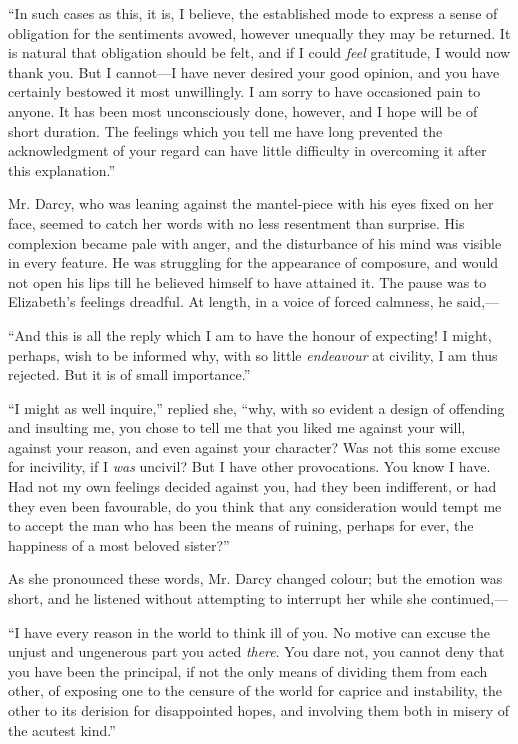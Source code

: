 \documentclass[12pt,openright]{book}
\begin{document}
“In such cases as this, it is, I believe, the established mode to express a sense of obligation for the sentiments avowed, however unequally they may be returned. It is natural that obligation should be felt, and if I could \textit{feel} gratitude, I would now thank you. But I cannot—I have never desired your good opinion, and you have certainly bestowed it most unwillingly. I am sorry to have occasioned pain to anyone. It has been most unconsciously done, however, and I hope will be of short duration. The feelings which you tell me have long prevented the acknowledgment of your regard can have little difficulty in overcoming it after this explanation.”

Mr. Darcy, who was leaning against the mantel-piece with his eyes fixed on her face, seemed to catch her words with no less resentment than surprise. His complexion became pale with anger, and the disturbance of his mind was visible in every feature. He was struggling for the appearance of composure, and would not open his lips till he believed himself to have attained it. The pause was to Elizabeth’s feelings dreadful. At length, in a voice of forced calmness, he said,—

“And this is all the reply which I am to have the honour of expecting! I might, perhaps, wish to be informed why, with so little \textit{endeavour} at civility, I am thus rejected. But it is of small importance.”

“I might as well inquire,” replied she, “why, with so evident a design of offending and insulting me, you chose to tell me that you liked me against your will, against your reason, and even against your character? Was not this some excuse for incivility, if I \textit{was} uncivil? But I have other provocations. You know I have. Had not my own feelings decided against you, had they been indifferent, or had they even been favourable, do you think that any consideration would tempt me to accept the man who has been the means of ruining, perhaps for ever, the happiness of a most beloved sister?”

As she pronounced these words, Mr. Darcy changed colour; but the emotion was short, and he listened without attempting to interrupt her while she continued,—

“I have every reason in the world to think ill of you. No motive can excuse the unjust and ungenerous part you acted \textit{there}. You dare not, you cannot deny that you have been the principal, if not the only means of dividing them from each other, of exposing one to the censure of the world for caprice and instability, the other to its derision for disappointed hopes, and involving them both in misery of the acutest kind.”
\end{document}
